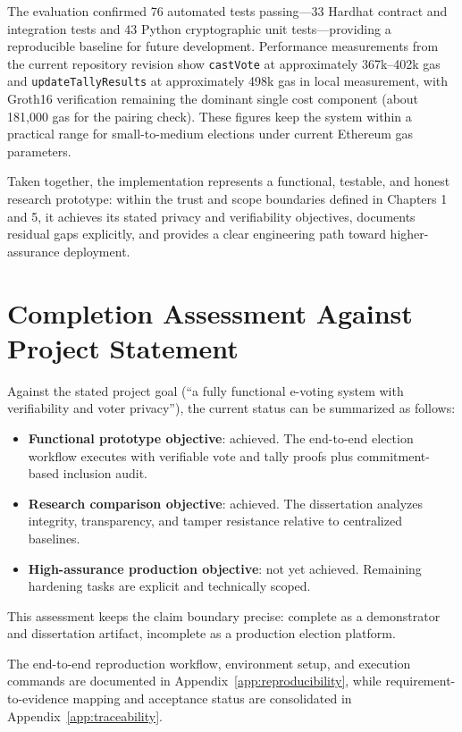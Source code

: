The evaluation confirmed 76 automated tests passing---33 Hardhat contract and integration tests and 43 Python cryptographic unit tests---providing a reproducible baseline for future development. Performance measurements from the current repository revision show \texttt{castVote} at approximately 367k--402k gas and \texttt{updateTallyResults} at approximately 498k gas in local measurement, with Groth16 verification remaining the dominant single cost component (about 181,000 gas for the pairing check). These figures keep the system within a practical range for small-to-medium elections under current Ethereum gas parameters.

Taken together, the implementation represents a functional, testable, and honest research prototype: within the trust and scope boundaries defined in Chapters 1 and 5, it achieves its stated privacy and verifiability objectives, documents residual gaps explicitly, and provides a clear engineering path toward higher-assurance deployment.

\section{Completion Assessment Against Project Statement}

Against the stated project goal (``a fully functional e-voting system with verifiability and voter privacy''), the current status can be summarized as follows:
\begin{itemize}
    \item \textbf{Functional prototype objective}: achieved. The end-to-end election workflow executes with verifiable vote and tally proofs plus commitment-based inclusion audit.
    \item \textbf{Research comparison objective}: achieved. The dissertation analyzes integrity, transparency, and tamper resistance relative to centralized baselines.
    \item \textbf{High-assurance production objective}: not yet achieved. Remaining hardening tasks are explicit and technically scoped.
\end{itemize}

This assessment keeps the claim boundary precise: complete as a demonstrator and dissertation artifact, incomplete as a production election platform.

The end-to-end reproduction workflow, environment setup, and execution commands are documented in Appendix~\ref{app:reproducibility}, while requirement-to-evidence mapping and acceptance status are consolidated in Appendix~\ref{app:traceability}.

